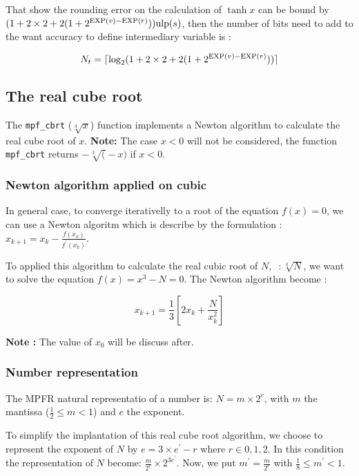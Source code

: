 \documentclass[12pt]{amsart}
\def\ulp{{\rm ulp}}
\def\exp{{\rm EXP}}
\begin{document}
That show the rounding error on the calculation of $\tanh x$ can be
bound by $(1+2 \times 2+2(1+2^{\exp(v)-\exp(r)})) \ulp(s)$, then the
number of bits need to add to the want accuracy to define intermediary
variable is :

\[
N_t=\lceil \log_2(1+2 \times 2+2(1+2^{\exp(v)-\exp(r)})) \rceil
\]


\subsection{The real cube root}

The {\tt mpf\_cbrt} ($\sqrt[3]{x}$) function implements a Newton
algorithm to calculate the real cube root of $x$. {\bf Note:} The case
$x<0$ will not be considered, the function {\tt mpf\_cbrt} returns $-\sqrt[3](-x)$ if $x<0$.

\subsubsection{Newton algorithm applied on cubic}

In general case, to converge iterativelly to a
root of the equation $f(x)=0$, we can use a Newton algoritm which is describe by the formulation :
$x_{k+1}=x_k-\frac{f(x_k)}{f^{'}(x_k)}$.

To applied this algorithm to calculate the real cubic root of
$N,\;\;: \sqrt[3]{N}$, we want to solve the equation $f(x)=x^3-N=0$. The
Newton algorithm become :

\begin{equation}\label{NewtonCbrt}
x_{k+1}=\frac{1}{3}[2x_k+\frac{N}{x^2_k}]
\end{equation}

{\bf Note :} The value of $x_0$ will be discuss after.

\subsubsection{Number representation}

The MPFR natural representatio of a number is: $N=m \times 2^e$, with
$m$ the mantissa ($\frac{1}{2} \leq m < 1$) and $e$ the exponent.

To simplify the implantation of this real cube root algorithm, we
choose to represent the exponent of $N$ by $e=3 \times e^{'}-r$ where $r \in {0,1,2}$.
In this condition the representation of $N$ become:
$\frac{m}{2^r} \times 2^{3 e^{'}}$. Now, we put $m^{'}=\frac{m}{2^r}$
with $\frac{1}{8} \leq m^{'} < 1$.
\end{document}
